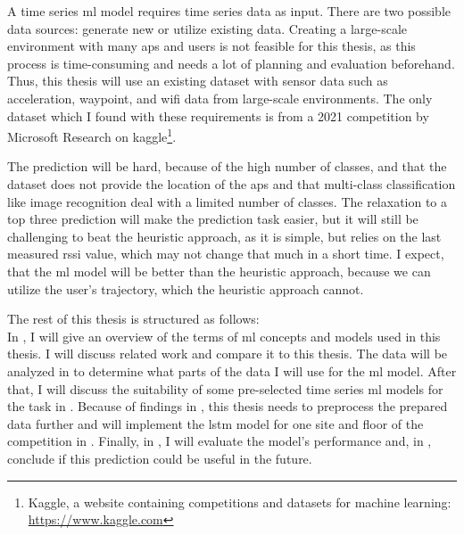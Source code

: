 A time series \ac{ml} model requires time series data as input.
There are two possible data sources: generate new or utilize existing data. 
Creating a large-scale environment with many \acp{ap} and users is not feasible for this thesis, as this process is time-consuming and needs a lot of planning and evaluation beforehand.
Thus, this thesis will use an existing dataset with sensor data such as acceleration, waypoint, and \ac{wifi} data from large-scale environments.
The only dataset which I found with these requirements is from a 2021 competition by Microsoft Research \cite{IndoorLocationNavigation} on kaggle\footnote{Kaggle, a website containing competitions and datasets for machine learning: \url{https://www.kaggle.com}}.

The prediction will be hard, because of the high number of classes, and that the dataset does not provide the location of the \acp{ap} and that multi-class classification like image recognition deal with a limited number of classes.
The relaxation to a top three prediction will make the prediction task easier, but it will still be challenging to beat the heuristic approach, as it is simple, but relies on the last measured \ac{rssi} value, which may not change that much in a short time. 
I expect, that the \ac{ml} model will be better than the heuristic approach, because we can utilize the user's trajectory, which the heuristic approach cannot.

The rest of this thesis is structured as follows:\\
In , I will give an overview of the terms of \ac{ml} concepts and models used in this thesis.
 I will discuss related work and compare it to this thesis.
The data will be analyzed in  to determine what parts of the data I will use for the \ac{ml} model.
After that, I will discuss the suitability of some pre-selected time series \ac{ml} models for the task in . 
Because of findings in , this thesis needs to preprocess the prepared data further and will implement the \ac{lstm} model for one site and floor of the competition in .
Finally, in , I will evaluate the model's performance and, in , conclude if this prediction could be useful in the future.
